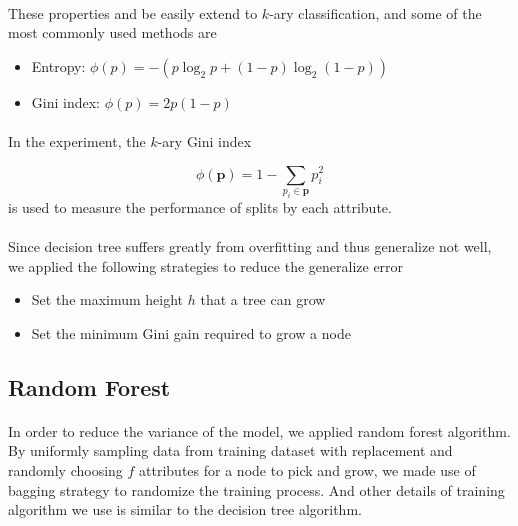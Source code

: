 \documentclass[11pt]{article}
\begin{document}
    \paragraph{}	
    	These properties and be easily extend to $k$-ary classification, and some of the most commonly used methods are
    	\begin{itemize}
    		\item Entropy: $\phi(p) = -(p\log_2p + (1 - p)\log_2(1 - p))$
    		\item Gini index: $\phi(p) = 2p(1 - p)$
    	\end{itemize}
    	
    \paragraph{}
    	In the experiment, the $k$-ary Gini index 
    	
    	\[\phi(\mathbf{p}) = 1 - \sum_{p_i \in \mathbf{p}} p_i^2\]
    	is used to measure the performance of splits by each attribute.
    	
    \paragraph{}
    	Since decision tree suffers greatly from overfitting and thus generalize not well, we applied the following strategies to reduce the generalize error
    	
    	\begin{itemize}
    		\item Set the maximum height $h$ that a tree can grow
    		\item Set the minimum Gini gain required to grow a node
    	\end{itemize}
    	
    \subsection{Random Forest}
    \paragraph{}
    	In order to reduce the variance of the model, we applied random forest algorithm. By uniformly sampling data from training dataset with replacement and randomly choosing $f$ attributes for a node to pick and grow, we made use of bagging strategy to randomize the training process. And other details of training algorithm we use is similar to the decision tree algorithm.
    
\end{document}
